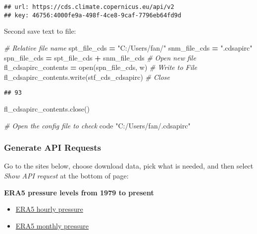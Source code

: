 \documentclass[
]{book}
\newenvironment{Shaded}{\begin{snugshade}}{\end{snugshade}}
\newcommand{\BuiltInTok}[1]{#1}
\newcommand{\CommentTok}[1]{\textcolor[rgb]{0.56,0.35,0.01}{\textit{#1}}}
\newcommand{\ExtensionTok}[1]{#1}
\newcommand{\NormalTok}[1]{#1}
\newcommand{\OperatorTok}[1]{\textcolor[rgb]{0.81,0.36,0.00}{\textbf{#1}}}
\newcommand{\StringTok}[1]{\textcolor[rgb]{0.31,0.60,0.02}{#1}}
\providecommand{\tightlist}{%
  \setlength{\itemsep}{0pt}\setlength{\parskip}{0pt}}
\begin{document}
\begin{verbatim}
## url: https://cds.climate.copernicus.eu/api/v2
## key: 46756:4000fe9a-498f-4ce8-9caf-7796eb64fd9d
\end{verbatim}

Second save text to file:

\begin{Shaded}
\begin{Highlighting}[]
\CommentTok{\# Relative file name}
\NormalTok{spt\_file\_cds }\OperatorTok{=} \StringTok{"C:/Users/fan/"}
\NormalTok{snm\_file\_cds }\OperatorTok{=} \StringTok{".cdsapirc"}
\NormalTok{spn\_file\_cds }\OperatorTok{=}\NormalTok{ spt\_file\_cds }\OperatorTok{+}\NormalTok{ snm\_file\_cds }
\CommentTok{\# Open new file}
\NormalTok{fl\_cdsapirc\_contents }\OperatorTok{=} \BuiltInTok{open}\NormalTok{(spn\_file\_cds, }\StringTok{\textquotesingle{}w\textquotesingle{}}\NormalTok{)}
\CommentTok{\# Write to File}
\NormalTok{fl\_cdsapirc\_contents.write(stf\_cds\_cdsapirc)}
\CommentTok{\# Close}
\end{Highlighting}
\end{Shaded}

\begin{verbatim}
## 93
\end{verbatim}

\begin{Shaded}
\begin{Highlighting}[]
\NormalTok{fl\_cdsapirc\_contents.close()}
\end{Highlighting}
\end{Shaded}

\begin{Shaded}
\begin{Highlighting}[]
\CommentTok{\# Open the config file to check}
\ExtensionTok{code} \StringTok{"C:/Users/fan/.cdsapirc"}
\end{Highlighting}
\end{Shaded}

\hypertarget{generate-api-requests}{%
\subsubsection{Generate API Requests}\label{generate-api-requests}}

Go to the sites below, choose download data, pick what is needed, and then select \emph{Show API request} at the bottom of page:

\textbf{ERA5 pressure levels from 1979 to present}

\begin{itemize}
\tightlist
\item
  \href{https://cds.climate.copernicus.eu/cdsapp\#!/dataset/reanalysis-era5-pressure-levels}{ERA5 hourly pressure}
\item
  \href{https://cds.climate.copernicus.eu/cdsapp\#!/dataset/reanalysis-era5-pressure-levels-monthly-means}{ERA5 monthly pressure}
\end{itemize}
\end{document}
